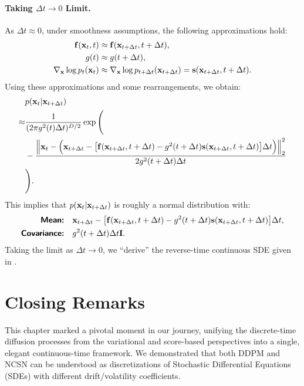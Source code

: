 \paragraph{Taking $\Delta t \rightarrow 0$ Limit.}
As $\Delta t \approx 0$, under smoothness assumptions, the following approximations hold:
\begin{align*}
    {\mathbf{f}}({\mathbf{x}}_t, t) &\approx {\mathbf{f}}({\mathbf{x}}_{t+\Delta t}, t+\Delta t), \\
    g(t) &\approx g(t+\Delta t), \\
    \nabla_{{\mathbf{x}}} \log p_t({\mathbf{x}}_t) &\approx \nabla_{{\mathbf{x}}} \log p_{t+\Delta t}({\mathbf{x}}_{t+\Delta t})  = {\mathbf{s}}({\mathbf{x}}_{t+\Delta t}, t+\Delta t).
\end{align*}
Using these approximations and some rearrangements, we obtain:
\begin{align*}
    &p({\mathbf{x}}_t | {\mathbf{x}}_{t+\Delta t}) \\ \approx &\frac{1}{(2\pi g^2(t) \Delta t)^{D/2}}  \exp \Bigg(
            \\ &-\frac{\Big\|{\mathbf{x}}_{t} - \Big({\mathbf{x}}_{t+\Delta t} - \big[{\mathbf{f}}({\mathbf{x}}_{t+\Delta t}, t+\Delta t) - g^2({t+\Delta t}) {\mathbf{s}}({\mathbf{x}}_{t+\Delta t}, t+\Delta t)\big] \Delta t\Big) \Big\|_2^2 }{2 g^2(t+\Delta t) \Delta t} \\
            &\Bigg).
\end{align*}
This implies that $p({\mathbf{x}}_t | {\mathbf{x}}_{t+\Delta t})$ is roughly a normal distribution with:
\begin{align*}
    \text{{\sffamily\textbf{Mean:}}} &  \quad{\mathbf{x}}_{t+\Delta t} - \big[{\mathbf{f}}({\mathbf{x}}_{t+\Delta t}, t+\Delta t) - g^2(t+\Delta t) {\mathbf{s}} ({\mathbf{x}}_{t+\Delta t}, t+\Delta t)\big] \Delta t, \\
    \text{{\sffamily\textbf{Covariance:}}} & \quad g^2(t+\Delta t) \Delta t \mathbf{I}.
\end{align*}
Taking the limit as $\Delta t \rightarrow 0$, we ``derive'' the reverse-time continuous SDE given in .






\clearpage
\newpage

\section{Closing Remarks}


This chapter marked a pivotal moment in our journey, unifying the discrete-time diffusion processes from the variational and score-based perspectives into a single, elegant continuous-time framework. We demonstrated that both DDPM and NCSN can be understood as discretizations of Stochastic Differential Equations (SDEs) with different drift/volatility coefficients.

